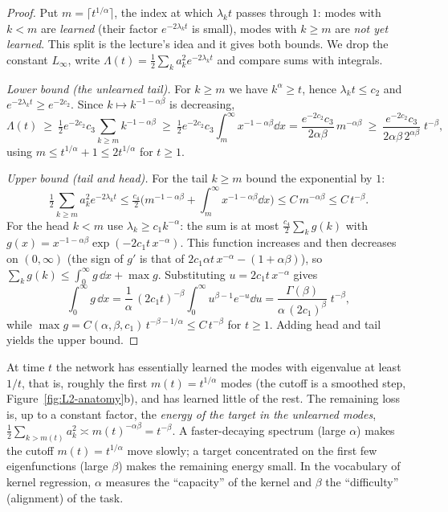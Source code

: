 \begin{proof}
Put $m=\lceil t^{1/\alpha}\rceil$, the index at which $\lambda_kt$ passes through $1$: modes with $k<m$ are \emph{learned} (their factor $e^{-2\lambda_kt}$ is small), modes with $k\ge m$ are \emph{not yet learned}. This split is the lecture's idea and it gives both bounds. We drop the constant $L_\infty$, write $\Lambda(t)=\tfrac12\sum_ka_k^2e^{-2\lambda_kt}$ and compare sums with integrals.


\emph{Lower bound (the unlearned tail).} For $k\ge m$ we have $k^\alpha\ge t$, hence $\lambda_kt\le c_2$ and $e^{-2\lambda_kt}\ge e^{-2c_2}$. Since $k\mapsto k^{-1-\alpha\beta}$ is decreasing,
\[
   \Lambda(t)\ \ge\ \tfrac12e^{-2c_2}c_3\sum_{k\ge m}k^{-1-\alpha\beta}\ \ge\ \tfrac12e^{-2c_2}c_3\int_m^\infty x^{-1-\alpha\beta}\dd x=\frac{e^{-2c_2}c_3}{2\alpha\beta}\,m^{-\alpha\beta}\ \ge\ \frac{e^{-2c_2}c_3}{2\alpha\beta\,2^{\alpha\beta}}\;t^{-\beta},
\]
using $m\le t^{1/\alpha}+1\le2t^{1/\alpha}$ for $t\ge1$.

\emph{Upper bound (tail and head).} For the tail $k\ge m$ bound the exponential by $1$:
\[
  \tfrac12\sum_{k\ge m}a_k^2e^{-2\lambda_kt}\le\tfrac{c_4}2\Big(m^{-1-\alpha\beta}+\int_m^\infty x^{-1-\alpha\beta}\dd x\Big)\le C\,m^{-\alpha\beta}\le C\,t^{-\beta}.
\]
For the head $k<m$ use $\lambda_k\ge c_1k^{-\alpha}$: the sum is at most $\tfrac{c_4}2\sum_kg(k)$ with $g(x)=x^{-1-\alpha\beta}\exp(-2c_1t\,x^{-\alpha})$. This function increases and then decreases on $(0,\infty)$ (the sign of $g'$ is that of $2c_1\alpha t\,x^{-\alpha}-(1+\alpha\beta)$), so $\sum_kg(k)\le\int_0^\infty g\,\dd x+\max g$. Substituting $u=2c_1t\,x^{-\alpha}$ gives
\[
  \int_0^\infty g\,\dd x=\frac1\alpha\,(2c_1t)^{-\beta}\int_0^\infty u^{\beta-1}e^{-u}\dd u=\frac{\Gamma(\beta)}{\alpha\,(2c_1)^{\beta}}\;t^{-\beta},
\]
while $\max g=C(\alpha,\beta,c_1)\,t^{-\beta-1/\alpha}\le C\,t^{-\beta}$ for $t\ge1$. Adding head and tail yields the upper bound.
\end{proof}

\begin{intuition}
At time $t$ the network has essentially learned the modes with eigenvalue at least $1/t$, that is, roughly the first $m(t)=t^{1/\alpha}$ modes (the cutoff is a smoothed step, Figure~\ref{fig:L2-anatomy}b), and has learned little of the rest. The remaining loss is, up to a constant factor, the \emph{energy of the target in the unlearned modes},
$\tfrac12\sum_{k>m(t)}a_k^2\asymp m(t)^{-\alpha\beta}=t^{-\beta}$. A faster-decaying spectrum (large $\alpha$) makes the cutoff $m(t)=t^{1/\alpha}$ move slowly; a target concentrated on the first few eigenfunctions (large $\beta$) makes the remaining energy small. In the vocabulary of kernel regression,
$\alpha$ measures the ``capacity'' of the kernel and $\beta$ the ``difficulty'' (alignment) of the task.
\end{intuition}

